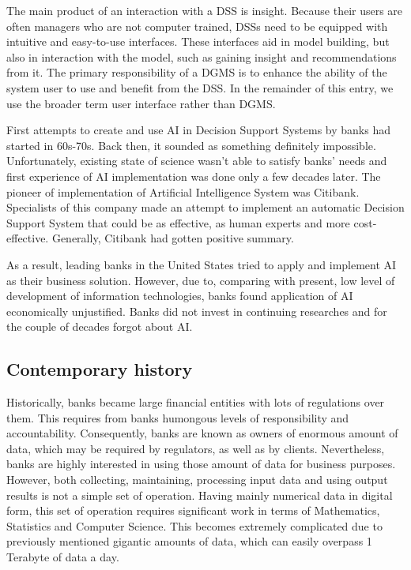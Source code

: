 The main product of an interaction with a DSS is insight. 
Because their users are often managers who are not computer trained, DSSs need to be equipped with intuitive and easy-to-use interfaces. 
These interfaces aid in model building, but also in interaction with the model, such as gaining insight and recommendations from it.
The primary responsibility of a DGMS is to enhance the ability of the system user to use and benefit from the DSS. 
In the remainder of this entry, we use the broader term user interface rather than DGMS.

First attempts to create and use AI in Decision Support Systems by banks had started in 60s-70s.
Back then, it sounded as something definitely impossible.
Unfortunately, existing state of science wasn't able to satisfy banks' needs and first experience of AI implementation was done only a few decades later.
The pioneer of implementation of Artificial Intelligence System was Citibank.
Specialists of this company made an attempt to implement an automatic Decision Support System that could be as effective, as human experts and more cost-effective.
Generally, Citibank had gotten positive summary.
\cite{decision_support_systems_book}

As a result, leading banks in the United States tried to apply and implement AI as their business solution.
However, due to, comparing with present, low level of development of information technologies, banks found application of AI economically unjustified.
Banks did not invest in continuing researches and for the couple of decades forgot about AI.



\subsection{Contemporary history}

Historically, banks became large financial entities with lots of regulations over them.
This requires from banks humongous levels of responsibility and accountability.
Consequently, banks are known as owners of enormous amount of data, which may be required by regulators, as well as by clients.
Nevertheless, banks are highly interested in using those amount of data for business purposes.
However, both collecting, maintaining, processing input data and using output results is not a simple set of operation.
Having mainly numerical data in digital form, this set of operation requires significant work in terms of Mathematics, Statistics and Computer Science.
This becomes extremely complicated due to previously mentioned gigantic amounts of data, which can easily overpass 1 Terabyte of data a day.

